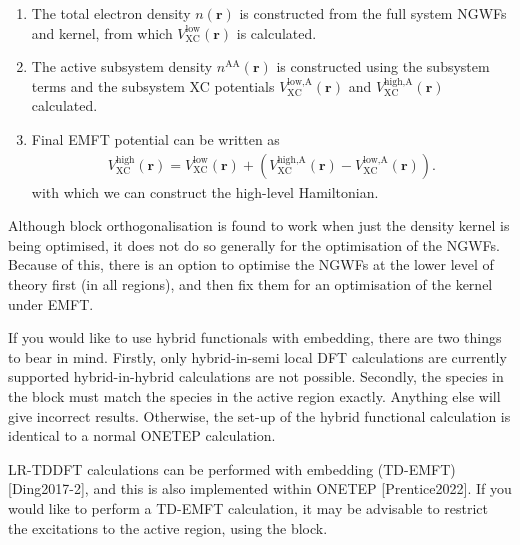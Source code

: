 \documentclass[letterpaper,10pt,english]{sphinxmanual}
\begin{document}
\begin{enumerate}
\item {} 
The total electron density \(n{\left(\mathbf{r}\right)}\) is
constructed from the full system NGWFs and kernel, from which
\(V_\text{XC}^\text{low}{\left(\mathbf{r}\right)}\) is
calculated.

\item {} 
The active subsystem density
\(n^\text{AA}{\left(\mathbf{r}\right)}\) is constructed using the
subsystem terms and the subsystem XC potentials
\(V_\text{XC}^\text{low,A}{\left(\mathbf{r}\right)}\) and
\(V_\text{XC}^\text{high,A}{\left(\mathbf{r}\right)}\)
calculated.

\item {} 
Final EMFT potential can be written as
\begin{equation*}
\begin{split}V_\text{XC}^\text{high}{\left(\mathbf{r}\right)}
            =V_\text{XC}^\text{low}{\left(\mathbf{r}\right)}+\left(V_\text{XC}^\text{high,A}{\left(\mathbf{r}\right)}-V_\text{XC}^\text{low,A}{\left(\mathbf{r}\right)}\right).\end{split}
\end{equation*}
with which we can construct the high-level Hamiltonian.

\end{enumerate}

Although block orthogonalisation is found to work when just the density
kernel is being optimised, it does not do so generally for the
optimisation of the NGWFs. Because of this, there is an option to
optimise the NGWFs at the lower level of theory first (in all regions),
and then fix them for an optimisation of the kernel under EMFT.

If you would like to use hybrid functionals with embedding, there are
two things to bear in mind. Firstly, only hybrid-in-semi local DFT
calculations are currently supported \textendash{} hybrid-in-hybrid calculations are
not possible. Secondly, the species in the 
block must match the species in the active region exactly. Anything else
will give incorrect results. Otherwise, the set-up of the hybrid
functional calculation is identical to a normal ONETEP calculation.

LR-TDDFT calculations can be performed with embedding
(TD-EMFT) {[}Ding2017-2{]}, and this is also implemented
within ONETEP {[}Prentice2022{]}. If you would like to
perform a TD-EMFT calculation, it may be advisable to restrict the
excitations to the active region, using the 
block.
\end{document}
